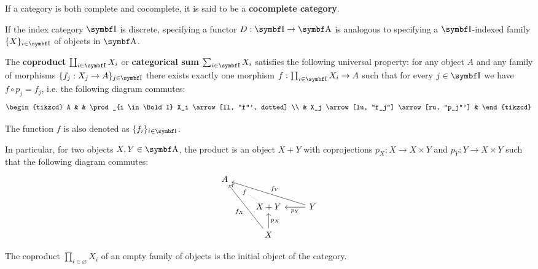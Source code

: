\begin{definition}\label{def:cocomplete_category}
  If a category is both complete and cocomplete, it is said to be a \textbf{cocomplete category}.
\end{definition}

\begin{definition}\label{def:categorical_coproduct}\cite[definition 5.2.2]{Leinster2014}
  If the index category \( \Bold I \) is discrete, specifying a functor \( D: \Bold I \to \Bold A \) is analogous to specifying a \( \Bold I \)-indexed family \( \{ X \}_{i \in \Bold I} \) of objects in \( \Bold A \).

  The \textbf{coproduct} \( \coprod_{i \in \Bold I} X_i \) or \textbf{categorical sum} \( \sum_{i \in \Bold I} X_i \) satisfies the following universal property: for any object \( A \) and any family of morphisms \( \{ f_j: {X_j} \to A \}_{j \in \Bold I} \) there exists exactly one morphism \( f: \coprod_{i \in \Bold I} X_i \to A \) such that for every \( j \in \Bold I \) we have \( f \circ p_j = f_j \), i.e. the following diagram commutes:
  \begin{equation*}
    \begin{tikzcd}
      A &                                          & \prod_{i \in \Bold I} X_i \arrow[ll, "f"', dotted] \\
        & X_j \arrow[lu, "f_j"] \arrow[ru, "p_j"'] &
    \end{tikzcd}
  \end{equation*}

  The function \( f \) is also denoted as \( \{ f_i \}_{i \in \Bold I} \).

  In particular, for two objects \( X, Y \in \Bold A \), the product is an object \( X + Y \) with coprojections \( p_X: X \to X \times Y \) and \( p_Y: Y \to X \times Y \) such that the following diagram commutes:
  \begin{equation*}
    \begin{tikzcd}
      A & & \\
        & X + Y \arrow[lu, "f" description, dotted] & Y \arrow[llu, "f_Y"'] \arrow[l, "p_Y"] \\
        & X \arrow[luu, "f_X"] \arrow[u, "p_X"']    &
    \end{tikzcd}
  \end{equation*}
\end{definition}

\begin{note}\label{note:empty_categorical_coproduct}
  The coproduct \( \prod_{i \in \varnothing} X_i \) of an empty family of objects is the initial object of the category.
\end{note}

